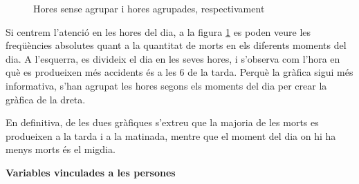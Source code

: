 \documentclass[12pt,longbibliography]{article}
\theoremstyle{definition}
\theoremstyle{remark}
\begin{document}
\begin{figure}[h!]
\par
{}%
\hfill
{}%
\par

\caption{Hores sense agrupar i hores agrupades, respectivament}
\label{fig:G2}
\end{figure}


Si centrem l'atenció en les hores del dia, a la figura \ref{fig:G2} es poden veure les freqüències absolutes quant a la quantitat de morts en els diferents moments del dia. A l'esquerra, es divideix el dia en les seves hores, i s'observa com l'hora en què es produeixen més accidents és a les 6 de la tarda. Perquè la gràfica sigui més informativa, s'han agrupat les hores segons els moments del dia per crear la gràfica de la dreta. 


En definitiva, de les dues gràfiques s'extreu que la majoria de les morts es produeixen a la tarda i a la matinada, mentre que el moment del dia on hi ha menys morts és el migdia.


\textbf{Variables vinculades a les persones}
\end{document}
